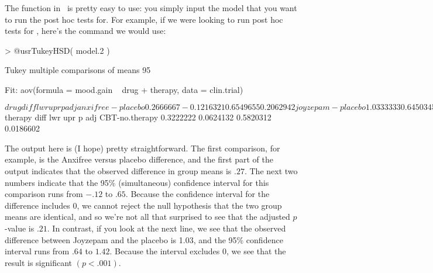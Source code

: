 The  function in \R\ is pretty easy to use: you simply input the model that you want to run the post hoc tests for. For example, if we were looking to run post hoc tests for , here's the command we would use:
\begin{rblock1}
> @usr{TukeyHSD( model.2 )}

  Tukey multiple comparisons of means
    95%

Fit: aov(formula = mood.gain ~ drug + therapy, data = clin.trial)

$drug
                       diff        lwr       upr     p adj
anxifree-placebo  0.2666667 -0.1216321 0.6549655 0.2062942
joyzepam-placebo  1.0333333  0.6450345 1.4216321 0.0000186
joyzepam-anxifree 0.7666667  0.3783679 1.1549655 0.0003934

$therapy
                    diff       lwr       upr     p adj
CBT-no.therapy 0.3222222 0.0624132 0.5820312 0.0186602
\end{rblock1}
The output here is (I hope) pretty straightforward. The first comparison, for example, is the Anxifree versus placebo difference, and the first part of the output indicates that the observed difference in group means is $.27$. The next two numbers indicate that the 95\% (simultaneous) confidence interval for this comparison runs from $-.12$ to $.65$. Because the confidence interval for the difference includes 0, we cannot reject the null hypothesis that the two group means are identical, and so we're not all that surprised to see that the adjusted $p$-value is $.21$. In contrast, if you look at the next line, we see that the observed difference between Joyzepam and the placebo is 1.03, and the 95\% confidence interval runs from $.64$ to $1.42$. Because the interval excludes 0, we see that the result is significant $(p<.001)$.


